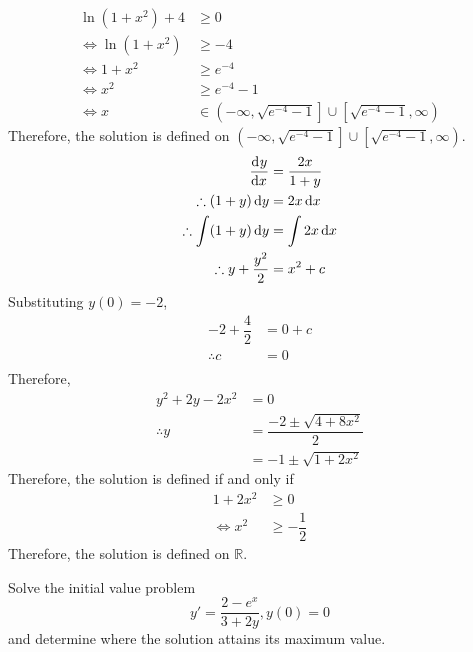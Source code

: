 \documentclass[fleqn, a4paper, 12pt, oneside]{amsart}
\theoremstyle{definition}
\theoremstyle{theorem}
\begin{document}
\begin{solution}
\begin{tasks}
\begin{align*}
				\ln (1 + x^2) + 4 &\ge 0\\
				\iff \ln (1 + x^2) &\ge -4\\
				\iff 1 + x^2 &\ge e^{-4}\\
				\iff x^2 &\ge e^{-4} - 1\\
				\iff x &\in \left( -\infty, \sqrt{e^{-4} - 1} \right] \cup \left[ \sqrt{e^{-4} - 1}, \infty \right)
			\end{align*}
			Therefore, the solution is defined on $\left( -\infty, \sqrt{e^{-4} - 1} \right] \cup \left[ \sqrt{e^{-4} - 1}, \infty \right)$.
		\task
			\begin{align*}
				\dod{y}{x} &= \dfrac{2x}{1 + y}\\
				\therefore (1 + y) \dif y &= 2 x \dif x\\
				\therefore \int (1 + y) \dif y &= \int 2 x \dif x\\
				\therefore y + \dfrac{y^2}{2} &= x^2 + c
			\end{align*}
			Substituting $y(0) = -2$,
			\begin{align*}
				-2 + \dfrac{4}{2} &= 0 + c\\
				\therefore c &= 0\\
			\end{align*}
			Therefore,
			\begin{align*}
				y^2 + 2y - 2x^2 &= 0\\
				\therefore y &= \dfrac{-2 \pm \sqrt{4 + 8x^2}}{2}\\
				&= -1 \pm \sqrt{1 + 2x^2}
			\end{align*}
			Therefore, the solution is defined if and only if
			\begin{align*}
				1 + 2x^2 &\ge 0\\
				\iff x^2 &\ge -\dfrac{1}{2}
			\end{align*}
			Therefore, the solution is defined on $\mathbb{R}$.
	\end{tasks}
\end{solution}

\begin{question}
	Solve the initial value problem
	\begin{equation*}
		y' = \dfrac{2 - e^x}{3 + 2y}, y(0) = 0
	\end{equation*}
	and determine where the solution attains its maximum value.
\end{question}
\end{document}
